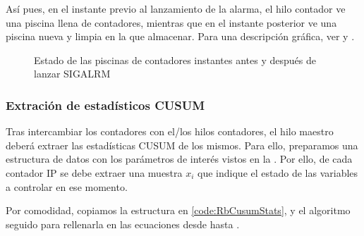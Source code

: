 Así pues, en el instante previo al lanzamiento de la alarma, el hilo contador ve una piscina llena de contadores, 
mientras que en el instante posterior ve una piscina nueva y limpia en la que almacenar. Para una descripción 
gráfica, ver  y .

\begin{figure}[htbp]
\centering
{}%
\hfill
{}%

\caption{Estado de las piscinas de contadores instantes antes y después de lanzar SIGALRM}
\end{figure}
%

\subsubsection{Extración de estadísticos CUSUM}

Tras intercambiar los contadores con el/los hilos contadores, el hilo maestro deberá extraer las estadísticas CUSUM de 
los mismos. Para ello, preparamos una estructura de datos con los parámetros de interés vistos en la 
. Por ello, de cada contador IP se debe extraer una muestra $x_i$ que indique el estado de 
las variables a controlar en ese momento.

Por comodidad, copiamos la estructura en \lstlistingname{} \ref{code:RbCusumStats}, y el algoritmo seguido para 
rellenarla en las ecuaciones desde  hasta .

